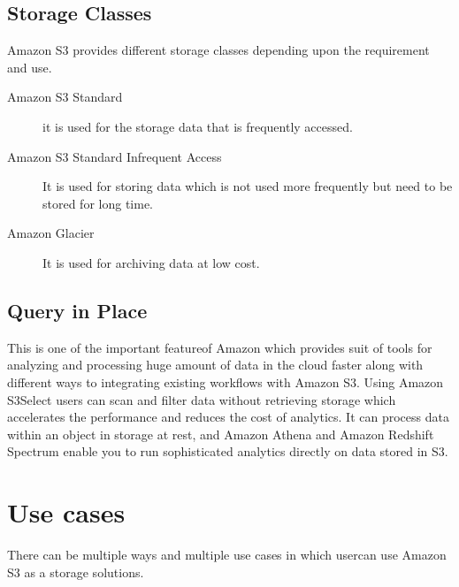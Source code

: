 \subsection{Storage Classes}

Amazon S3 provides different storage classes depending upon the requirement and
use.

\begin{description}

\item [Amazon S3 Standard] it is used for the storage data that is
  frequently accessed.
\item [Amazon S3 Standard Infrequent Access] It is used for storing
  data which is not used more frequently but need to be stored for
  long time.
\item [Amazon Glacier] It is used for archiving data at low cost. 

\end{description}


\subsection{Query in Place} 

This is one of the important feature\GE of Amazon which provides suit
of tools for analyzing and processing huge amount of data in the cloud
faster along with different ways to integrating existing workflows
with Amazon S3. Using Amazon S3Select users can scan and filter data
without retrieving storage which accelerates the performance and
reduces the cost of analytics. It can process data within an object in
storage at rest, and Amazon Athena
\cite{} and Amazon Redshift Spectrum \cite{?} enable
you to run sophisticated analytics directly on data stored in S3.

\section{Use cases}
There can be multiple ways and multiple use cases in which user\GE can use Amazon
S3 as a storage solutions. 

